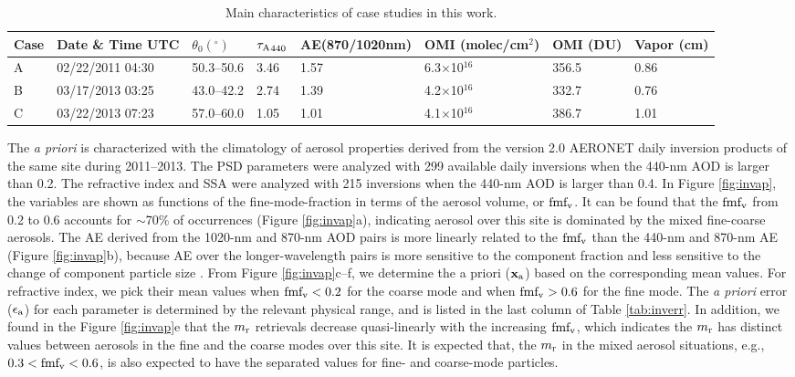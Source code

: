 \begin{table}[b]
  \centering
  \small
  \caption{Main characteristics of case studies in this work.}
  \label{tab:invcase}
  \begin{tabular}{p{2em} C{7em}  C{4em} C{2em} C{5em} C{4em} C{4em} C{2em}}
  \toprule
  Case  & Date \& Time \newline UTC& $\theta_0(^\circ)$ & ${\tau_\text{A}}_{440}$ &
  AE\newline(870/1020nm)& OMI  \newline(molec/cm$^2$) & 
  OMI  \newline (DU) & Vapor \newline (cm) \\
  \midrule
   A & 02/22/2011 04:30	& 50.3--50.6 & 3.46 & 1.57 & 6.3$\times$10$^{16}$ & 356.5 & 0.86\\
   B & 03/17/2013 03:25 & 43.0--42.2 & 2.74 & 1.39 & 4.2$\times$10$^{16}$ & 332.7 & 0.76\\
   C & 03/22/2013 07:23 & 57.0--60.0 & 1.05 & 1.01 & 4.1$\times$10$^{16}$ & 386.7 & 1.01\\
  \bottomrule
  \end{tabular}
\end{table}

The \textit{a priori} is characterized with the climatology of aerosol properties
derived from the version 2.0 AERONET daily inversion products of the same site
during 2011--2013. The PSD parameters were analyzed with 299 available daily
inversions when the 440-nm AOD is larger than 0.2. The refractive index and SSA
were analyzed with 215 inversions when the 440-nm AOD is larger than 0.4. In
Figure \ref{fig:invap}, the variables are shown as functions of the 
fine-mode-fraction in terms of the aerosol volume, or $\text{fmf}_\text{v}$. It can be found 
that the $\text{fmf}_\text{v}$ from 0.2 to 0.6 accounts for $\sim$70\% of occurrences (Figure
\ref{fig:invap}a), indicating aerosol over this site is dominated by the mixed 
fine-coarse aerosols. The AE derived from the 1020-nm and 870-nm AOD pairs is 
more linearly related to the $\text{fmf}_\text{v}$ than the 440-nm and 870-nm AE (Figure
\ref{fig:invap}b), because AE over the longer-wavelength pairs is more
sensitive to the component fraction and less sensitive to the change of
component particle size \citep{Schuster06}. From Figure \ref{fig:invap}c--f, 
we determine the a priori ($\mathbf{x}_\text{a}$) based on the corresponding mean values. 
For refractive index, we pick their mean values when $\text{fmf}_\text{v}<0.2$ for the coarse
mode and when $\text{fmf}_\text{v}>0.6$ for the fine mode. The \textit{a priori} error 
($\epsilon_\text{a}$) for each parameter is determined by the relevant physical 
range, and is listed in the last column of Table \ref{tab:inverr}. 
In addition, we found in the Figure \ref{fig:invap}e that the $m_\text{r}$ 
retrievals decrease quasi-linearly with the increasing $\text{fmf}_\text{v}$, which indicates
the $m_\text{r}$ has distinct values between aerosols in the fine and the coarse
modes over this site. It is expected that, the $m_\text{r}$ in the mixed aerosol
situations, e.g., $0.3<\text{fmf}_\text{v}<0.6$, is also expected to have the separated 
values for fine- and coarse-mode particles.

